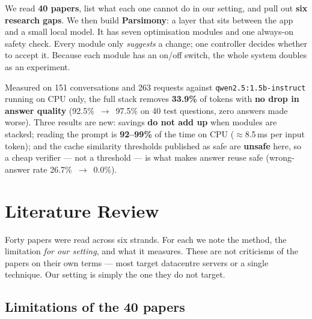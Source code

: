 \documentclass[11pt,a4paper]{article}
\begin{document}
We read \textbf{40 papers}, list what each one cannot do in our setting, and pull
out \textbf{six research gaps}. We then build \textbf{Parsimony}: a layer that sits
between the app and a small local model. It has seven optimisation modules and one
always-on safety check. Every module only \emph{suggests} a change; one controller
decides whether to accept it. Because each module has an on/off switch, the whole
system doubles as an experiment.

Measured on 151 conversations and 263 requests against \texttt{qwen2.5:1.5b-instruct}
running on CPU only, the full stack removes \textbf{33.9\%} of tokens with
\textbf{no drop in answer quality} (92.5\%~$\rightarrow$~97.5\% on 40 test questions,
zero answers made worse). Three results are new: savings \textbf{do not add up} when
modules are stacked; reading the prompt is \textbf{92--99\%} of the time on CPU
($\approx$8.5\,ms per input token); and the cache similarity thresholds published as
safe are \textbf{unsafe} here, so a cheap verifier --- not a threshold --- is what
makes answer reuse safe (wrong-answer rate 26.7\%~$\rightarrow$~0.0\%).

\section{Literature Review}

Forty papers were read across six strands. For each we note the method, the
limitation \emph{for our setting}, and what it measures. These are not criticisms of
the papers on their own terms --- most target datacentre servers or a single
technique. Our setting is simply the one they do not target.

\subsection{Limitations of the 40 papers}
\end{document}
